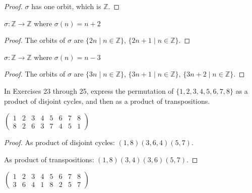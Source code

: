 \begin{proof}
    $\sigma$ has one orbit, which is $\mathbb{Z}$.
\end{proof}

\newpage
\begin{exercise}
    $\sigma: \mathbb{Z} \to \mathbb{Z}$ where $\sigma(n) = n + 2$
\end{exercise}

\begin{proof}
    The orbits of $\sigma$ are $\{ 2n \mid n\in\mathbb{Z} \}$, $\{ 2n + 1 \mid n\in\mathbb{Z} \}$.
\end{proof}

\newpage
\begin{exercise}
    $\sigma: \mathbb{Z} \to \mathbb{Z}$ where $\sigma(n) = n - 3$
\end{exercise}

\begin{proof}
    The orbits of $\sigma$ are $\{ 3n \mid n\in\mathbb{Z} \}$, $\{ 3n + 1 \mid n\in\mathbb{Z} \}$, $\{ 3n + 2 \mid n\in\mathbb{Z} \}$.
\end{proof}

In Exercises 23 through 25, express the permutation of $\{ 1, 2, 3, 4, 5, 6, 7, 8 \}$ as a product of disjoint cycles, and then as a product of transpositions.

\newpage
\begin{exercise}
    $\begin{pmatrix}
            1 & 2 & 3 & 4 & 5 & 6 & 7 & 8 \\
            8 & 2 & 6 & 3 & 7 & 4 & 5 & 1
        \end{pmatrix}$
\end{exercise}

\begin{proof}
    As product of disjoint cycles: $(1, 8)(3, 6, 4)(5, 7)$.

    As product of transpositions: $(1, 8)(3, 4)(3, 6)(5, 7)$.
\end{proof}

\newpage
\begin{exercise}
    $\begin{pmatrix}
            1 & 2 & 3 & 4 & 5 & 6 & 7 & 8 \\
            3 & 6 & 4 & 1 & 8 & 2 & 5 & 7
        \end{pmatrix}$
\end{exercise}

